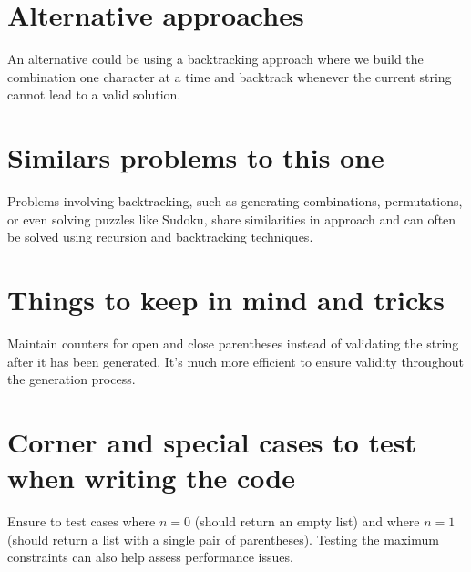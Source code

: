 \section*{Alternative approaches}

An alternative could be using a backtracking approach where we build the combination one character at a time and backtrack whenever the current string cannot lead to a valid solution.

\section*{Similars problems to this one}

Problems involving backtracking, such as generating combinations, permutations, or even solving puzzles like Sudoku, share similarities in approach and can often be solved using recursion and backtracking techniques.

\section*{Things to keep in mind and tricks}

Maintain counters for open and close parentheses instead of validating the string after it has been generated. It's much more efficient to ensure validity throughout the generation process.

\section*{Corner and special cases to test when writing the code}

Ensure to test cases where $n=0$ (should return an empty list) and where $n=1$ (should return a list with a single pair of parentheses). Testing the maximum constraints can also help assess performance issues.